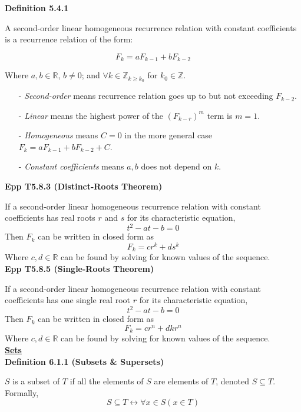 \documentclass[a4paper]{article}
\newcommand{\heading}[1]{{\small\underline{\textbf{#1}}}}
\newcommand{\subheading}[1]{{\scriptsize\textbf{#1}}}
\begin{document}
\begin{multicols*}{4}
\vspace{0.3cm}

\subheading{Definition 5.4.1}

A second-order linear homogeneous recurrence relation with constant coefficients
is a recurrence relation of the form:

$$F_k = aF_{k-1} + bF_{k-2}$$

Where $a, b \in \mathbb{R}$, $b \neq 0$; and $\forall k \in \mathbb{Z}_{k \geq
k_0}$ for $k_0 \in \mathbb{Z}$.

\begin{itemize}[leftmargin=*] \itemsep -0.5em
\item[-] \textit{Second-order} means recurrence relation goes up to but not
  exceeding $F_{k-2}$.
\item[-] \textit{Linear} means the highest power of the $(F_{k-r})^m$ term is
  $m=1$.
\item[-] \textit{Homogeneous} means $C=0$ in the more general case $F_k =
  aF_{k-1} + bF_{k-2} + C$.
\item[-] \textit{Constant coefficients} means $a, b$ does not depend on $k$.
\end{itemize}

\subheading{Epp T5.8.3 (Distinct-Roots Theorem)}

If a second-order linear homogeneous recurrence relation with constant
coefficients has real roots $r$ and $s$ for its characteristic equation,
$$t^2 - at - b = 0$$
Then $F_k$ can be written in closed form as
$$F_k = cr^k + ds^k$$
Where $c, d \in \mathbb{R}$ can be found by solving for known values of the
sequence. \\

\subheading{Epp T5.8.5 (Single-Roots Theorem)}

If a second-order linear homogeneous recurrence relation with constant
coefficients has one single real root $r$ for its characteristic equation,
$$t^2 - at - b = 0$$
Then $F_k$ can be written in closed form as
$$F_k = cr^n + dkr^n$$
Where $c, d \in \mathbb{R}$ can be found by solving for known values of the
sequence. \\

\heading{Sets} \\

\subheading{Definition 6.1.1 (Subsets \& Supersets)}

$S$ is a subset of $T$ if all the elements of $S$ are elements of $T$, denoted
$S \subseteq T$. Formally, $$S \subseteq T \longleftrightarrow \forall x \in S
(x \in T)$$


\end{multicols*}
\end{document}
